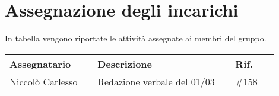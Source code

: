 \newpage
\section{Assegnazione degli incarichi}
In tabella vengono riportate le attività assegnate ai membri del gruppo.
\begin{center}
	{
		\renewcommand{\arraystretch}{1.5}
		\begin{tabular}{p{0.30\linewidth}|p{0.47\linewidth}|p{0.15\linewidth}}
			\textbf{Assegnatario}	& \textbf{Descrizione}			& \textbf{Rif.} \\
			\hline
			Niccolò Carlesso		& Redazione verbale del 01/03	& \#158			\\
			\hline
		\end{tabular}
	}
\end{center}


